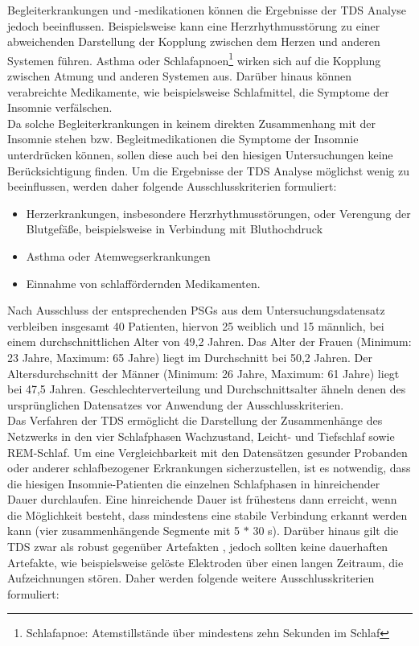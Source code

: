 Begleiterkrankungen und -medikationen können die Ergebnisse der \acs{TDS} Analyse jedoch beeinflussen. Beispielsweise kann eine Herzrhythmusstörung zu einer abweichenden Darstellung der Kopplung zwischen dem Herzen und anderen Systemen führen. Asthma oder Schlafapnoen\footnote{Schlafapnoe: Atemstillstände über mindestens zehn Sekunden im Schlaf} wirken sich auf die Kopplung zwischen Atmung und anderen Systemen aus. Darüber hinaus können verabreichte Medikamente, wie beispielsweise Schlafmittel, die Symptome der Insomnie verfälschen.\\

Da solche Begleiterkrankungen in keinem direkten Zusammenhang mit der Insomnie stehen bzw. Begleitmedikationen die Symptome der Insomnie unterdrücken können, sollen diese auch bei den hiesigen Untersuchungen keine Berücksichtigung finden. Um die Ergebnisse der \acs{TDS} Analyse möglichst wenig zu beeinflussen, werden daher folgende Ausschlusskriterien formuliert:\\

\begin{itemize}
\item Herzerkrankungen, insbesondere Herzrhythmusstörungen, oder Verengung der Blutgefäße, beispielsweise in Verbindung mit Bluthochdruck
\item Asthma oder Atemwegserkrankungen
\item Einnahme von schlaffördernden Medikamenten.\\
\end{itemize}

Nach Ausschluss der entsprechenden \acs{PSG}s aus dem Untersuchungsdatensatz verbleiben insgesamt 40 Patienten, hiervon 25 weiblich und 15 männlich, bei einem durchschnittlichen Alter von 49,2 Jahren. Das Alter der Frauen (Minimum: 23 Jahre, Maximum: 65 Jahre) liegt im Durchschnitt bei 50,2 Jahren. Der Altersdurchschnitt der Männer (Minimum: 26 Jahre, Maximum: 61 Jahre) liegt bei 47,5 Jahren. Geschlechterverteilung und Durchschnittsalter ähneln denen des ursprünglichen Datensatzes vor Anwendung der Ausschlusskriterien.\\

Das Verfahren der \acs{TDS} ermöglicht die Darstellung der Zusammenhänge des Netzwerks in den vier Schlafphasen Wachzustand, Leicht- und Tiefschlaf sowie \acs{REM}-Schlaf. Um eine Vergleichbarkeit mit den Datensätzen gesunder Probanden oder anderer schlafbezogener Erkrankungen sicherzustellen, ist es notwendig, dass die hiesigen Insomnie-Patienten die einzelnen Schlafphasen in hinreichender Dauer durchlaufen. Eine hinreichende Dauer ist frühestens dann erreicht, wenn die Möglichkeit besteht, dass mindestens eine stabile Verbindung erkannt werden kann (vier zusammenhängende Segmente mit 5 $*$ 30 s). Darüber hinaus gilt die \acs{TDS} zwar als robust gegenüber Artefakten \parencite{breuer_netzwerktopologie_2016}, jedoch sollten keine dauerhaften Artefakte, wie beispielsweise gelöste Elektroden über einen langen Zeitraum, die Aufzeichnungen stören. Daher werden folgende weitere Ausschlusskriterien formuliert:\\

